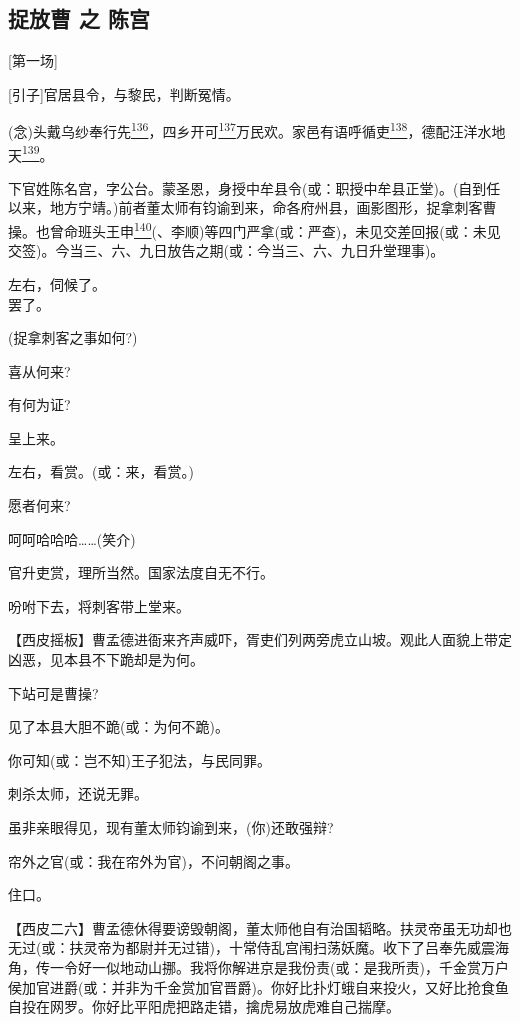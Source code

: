 \newpage
{} %
\hypertarget{ux6349ux653eux66f9-ux4e4b-ux9648ux5bab}{%
\subsection{捉放曹 之
陈宫}\label{ux6349ux653eux66f9-ux4e4b-ux9648ux5bab}}

{[}第一场{]}

{[}引子{]}官居县令，与黎民，判断冤情。

(念)头戴乌纱奉行先\protect\hyperlink{fn136}{\textsuperscript{136}}，四乡开可\protect\hyperlink{fn137}{\textsuperscript{137}}万民欢。家邑有语呼循吏\protect\hyperlink{fn138}{\textsuperscript{138}}，德配汪洋水地天\protect\hyperlink{fn139}{\textsuperscript{139}}。

下官姓陈名宫，字公台。蒙圣恩，身授中牟县令(或：职授中牟县正堂)。(自到任以来，地方宁靖。)前者董太师有钧谕到来，命各府州县，画影图形，捉拿刺客曹操。也曾命班头王申\protect\hyperlink{fn140}{\textsuperscript{140}}(、李顺)等四门严拿(或：严查)，未见交差回报(或：未见交签)。今当三、六、九日放告之期(或：今当三、六、九日升堂理事)。

左右，伺候了。\\
罢了。

(捉拿刺客之事如何?)

喜从何来?

有何为证?

呈上来。

左右，看赏。(或：来，看赏。)

愿者何来?

呵呵哈哈哈\ldots{}\ldots{}(笑介)

官升吏赏，理所当然。国家法度自无不行。

吩咐下去，将刺客带上堂来。

【西皮摇板】曹孟德进衙来齐声威吓，胥吏们列两旁虎立山坡。观此人面貌上带定凶恶，见本县不下跪却是为何。

下站可是曹操?

见了本县大胆不跪(或：为何不跪)。

你可知(或：岂不知)王子犯法，与民同罪。

刺杀太师，还说无罪。

虽非亲眼得见，现有董太师钧谕到来，(你)还敢强辩?

帘外之官(或：我在帘外为官)，不问朝阁之事。

住口。

【西皮二六】曹孟德休得要谤毁朝阁，董太师他自有治国韬略。扶灵帝虽无功却也无过(或：扶灵帝为都尉并无过错)，十常侍乱宫闱扫荡妖魔。收下了吕奉先威震海角，传一令好一似地动山挪。我将你解进京是我份责(或：是我所责)，千金赏万户侯加官进爵(或：并非为千金赏加官晋爵)。你好比扑灯蛾自来投火，又好比抢食鱼自投在网罗。你好比平阳虎把路走错，擒虎易放虎难自己揣摩。

